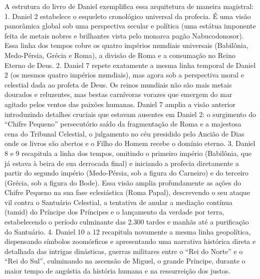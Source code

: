 \documentclass[11pt,a4paper,openany]{book}
\begin{document}
A estrutura do livro de Daniel exemplifica essa arquitetura de maneira magistral:
1. Daniel 2 estabelece o esqueleto cronológico universal da profecia. É uma visão panorâmica global sob uma perspectiva secular e política (uma estátua imponente feita de metais nobres e brilhantes vista pelo monarca pagão Nabucodonosor). Essa linha dos tempos cobre os quatro impérios mundiais universais (Babilônia, Medo-Pérsia, Grécia e Roma), a divisão de Roma e a consumação no Reino Eterno de Deus.
2. Daniel 7 repete exatamente a mesma linha temporal de Daniel 2 (os mesmos quatro impérios mundiais), mas agora sob a perspectiva moral e celestial dada ao profeta de Deus. Os reinos mundiais não são mais metais dourados e reluzentes, mas bestas carnívoras vorazes que emergem do mar agitado pelos ventos das paixões humanas. Daniel 7 amplia a visão anterior introduzindo detalhes cruciais que estavam ausentes em Daniel 2: o surgimento do ``Chifre Pequeno'' persecutório saído da fragmentação de Roma e a majestosa cena do Tribunal Celestial, o julgamento no céu presidido pelo Ancião de Dias onde os livros são abertos e o Filho do Homem recebe o domínio eterno.
3. Daniel 8 e 9 recapitula a linha dos tempos, omitindo o primeiro império (Babilônia, que já estava à beira de sua derrocada final) e iniciando a profecia diretamente a partir do segundo império (Medo-Pérsia, sob a figura do Carneiro) e do terceiro (Grécia, sob a figura do Bode). Essa visão amplia profundamente as ações do Chifre Pequeno na sua fase eclesiástica (Roma Papal), descrevendo o seu ataque vil contra o Santuário Celestial, a tentativa de anular a mediação contínua (tamid) do Príncipe dos Príncipes e o lançamento da verdade por terra, estabelecendo o período culminante das 2.300 tardes e manhãs até a purificação do Santuário.
4. Daniel 10 a 12 recapitula novamente a mesma linha geopolítica, dispensando símbolos zoomórficos e apresentando uma narrativa histórica direta e detalhada das intrigas dinásticas, guerras militares entre o ``Rei do Norte'' e o ``Rei do Sul'', culminando na ascensão de Miguel, o grande Príncipe, durante o maior tempo de angústia da história humana e na ressurreição dos justos.
\end{document}
